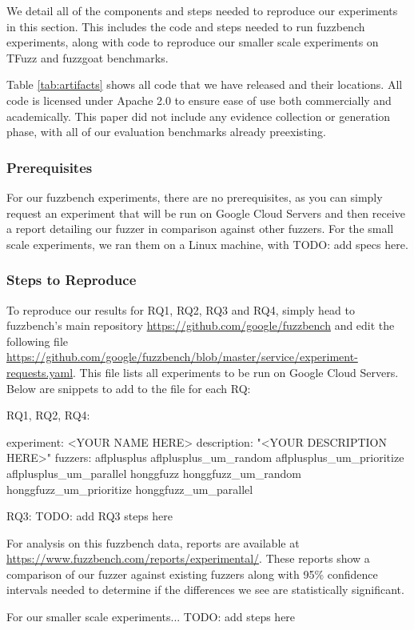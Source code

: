 \documentclass[manuscript,screen,review]{acmart}
\begin{document}
We detail all of the components and steps needed to reproduce our experiments in this section. This includes the code and steps needed to run fuzzbench experiments, along with code to reproduce our smaller
scale experiments on TFuzz and fuzzgoat benchmarks. 

Table \ref{tab:artifacts} shows all code that we have released and their locations. All code is licensed under Apache 2.0 to ensure ease of use both commercially and academically. This paper
did not include any evidence collection or generation phase, with all of our evaluation benchmarks already preexisting.

\subsubsection{Prerequisites}
For our fuzzbench experiments, there are no prerequisites, as you can simply request an experiment that will be run on Google Cloud Servers and then receive a report detailing our fuzzer in comparison
against other fuzzers. For the small scale experiments, we ran them on a Linux machine, with TODO: add specs here.

\subsubsection{Steps to Reproduce}
To reproduce our results for RQ1, RQ2, RQ3 and RQ4, simply head to fuzzbench's main repository \url{https://github.com/google/fuzzbench} and edit the following file 
\url{https://github.com/google/fuzzbench/blob/master/service/experiment-requests.yaml}. This file lists all experiments to be run on Google Cloud Servers. Below are snippets to
add to the file for each RQ:

RQ1, RQ2, RQ4:
\begin{code}
\- experiment: <YOUR NAME HERE>
    description: "<YOUR DESCRIPTION HERE>"
    fuzzers:
      \- aflplusplus
      \- aflplusplus\_um\_random
      \- aflplusplus\_um\_prioritize
      \- aflplusplus\_um\_parallel
      \- honggfuzz
      \- honggfuzz\_um\_random
      \- honggfuzz\_um\_prioritize
      \- honggfuzz\_um\_parallel
\end{code}

RQ3: TODO: add RQ3 steps here

For analysis on this fuzzbench data, reports are available at \url{https://www.fuzzbench.com/reports/experimental/}. These reports show a comparison of our fuzzer against existing 
fuzzers along with 95\% confidence intervals needed to determine if the differences we see are statistically significant.

For our smaller scale experiments... TODO: add steps here
\end{document}
